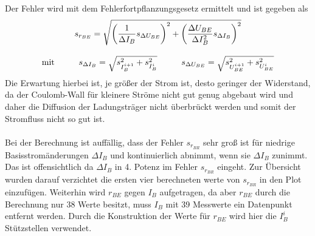 Der Fehler wird mit dem Fehlerfortpflanzungsgesetz ermittelt und ist gegeben als
\begin{gather}
    s_{r_{BE}}=\sqrt{\left(\frac{1}{\Delta I_B}s_{\Delta U_{BE}}\right)^2+\left(\frac{\Delta U_{BE}}{\Delta I_B^2}s_{\Delta I_B}\right)^2}\\[0.3cm]
    \text{mit}\hspace*{1cm} s_{\Delta I_B}=\sqrt{s_{I^{i+1}_B}^2+s_{I^{i}_B}^2}\hspace*{1cm} s_{\Delta U_{BE}}=\sqrt{s_{U^{i+1}_{BE}}^2+s_{U^{i}_{BE}}^2}
\end{gather}
Die Erwartung hierbei ist, je größer der Strom ist, desto geringer der Widerstand, da der Coulomb-Wall für kleinere Ströme nicht gut genug abgebaut wird und daher die Diffusion der Ladungsträger nicht überbrückt werden und somit der Stromfluss nicht so gut ist. \\
\\ Bei der Berechnung ist auffällig, dass der Fehler $s_{r_{BR}}$ sehr groß ist für niedrige Basisstromänderungen $\Delta I_B$ und kontinuierlich abnimmt, wenn sie $\Delta I_B$ zunimmt. Das ist offensichtlich da $\Delta I_B$ in 4. Potenz im Fehler $s_{r_{BR}}$ eingeht. Zur Übersicht wurden darauf verzichtet die ersten vier berechneten werte von $s_{r_{BR}}$ in den Plot einzufügen. Weiterhin wird $r_{BE}$ gegen $I_B$ aufgetragen, da aber $r_{BE}$ durch die Berechnung nur 38 Werte besitzt, muss $I_B$ mit 39 Messwerte ein Datenpunkt entfernt werden. Durch die Konstruktion der Werte für $r_{BE}$ wird hier die $I^i_B$ Stützstellen verwendet. 
\newpage
